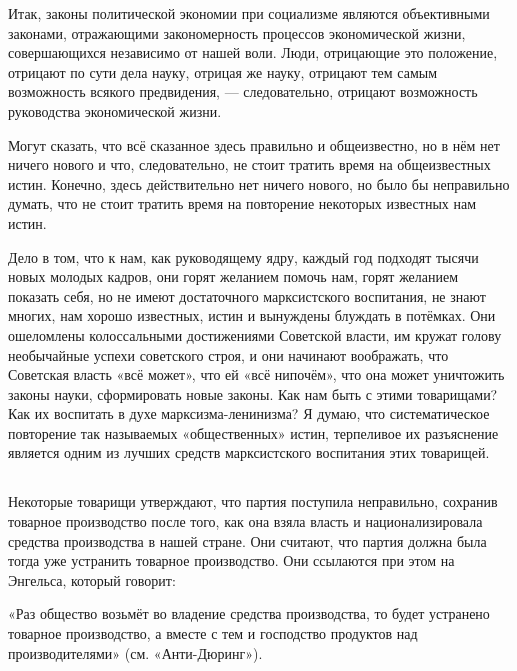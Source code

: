 \documentclass[12pt, a4paper, openany]{book}
\begin{document}
Итак, законы политической экономии при социализме являются объективными законами, отражающими закономерность процессов экономической жизни, совершающихся независимо от нашей воли. Люди, отрицающие это положение, отрицают по сути дела науку, отрицая же науку, отрицают тем самым возможность всякого предвидения, — следовательно, отрицают возможность руководства экономической жизни.

Могут сказать, что всё сказанное здесь правильно и общеизвестно, но в нём нет ничего нового и что, следовательно, не стоит тратить время на общеизвестных истин. Конечно, здесь действительно нет ничего нового, но было бы неправильно думать, что не стоит тратить время на повторение некоторых известных нам истин.

Дело в том, что к нам, как руководящему ядру, каждый год подходят тысячи новых молодых кадров, они горят желанием помочь нам, горят желанием показать себя, но не имеют достаточного марксистского воспитания, не знают многих, нам хорошо известных, истин и вынуждены блуждать в потёмках. Они ошеломлены колоссальными достижениями Советской власти, им кружат голову необычайные успехи советского строя, и они начинают воображать, что Советская власть «всё может», что ей «всё нипочём», что она может уничтожить законы науки, сформировать новые законы. Как нам быть с этими товарищами? Как их воспитать в духе марксизма-ленинизма? Я думаю, что систематическое повторение так называемых «общественных» истин, терпеливое их разъяснение является одним из лучших средств марксистского воспитания этих товарищей.

\vspace{0.4cm}

\subsection[2. Вопрос о товарном производстве при социализме]{}

Некоторые товарищи утверждают, что партия поступила неправильно, сохранив товарное производство после того, как она взяла власть и национализировала средства производства в нашей стране. Они считают, что партия должна была тогда уже устранить товарное производство. Они ссылаются при этом на Энгельса, который говорит:

«Раз общество возьмёт во владение средства производства, то будет устранено товарное производство, а вместе с тем и господство продуктов над производителями» (см. «Анти-Дюринг»).
\end{document}
